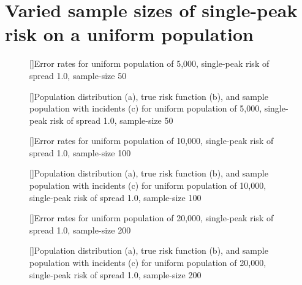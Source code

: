 {\section{Varied sample sizes of single-peak risk on a uniform population}
\label{sec:app:results_unifXk_X_1.0_1h}


\begin{figure}[!htb]
    
    []{Error rates for uniform population of 5,000, single-peak risk of \gls{spread} 1.0, sample-size 50}
    \label{tab:mean_error_rates:unif5k_50_1.0_1h}
    
    []{Population distribution (a), true risk function (b), and sample population with incidents (c) for uniform population of 5,000, single-peak risk of \gls{spread} 1.0, sample-size 50}
    \label{fig:distributions:unif5k_50_1.0_1h}    
\end{figure}


\begin{figure}[!htb]
    
    []{Error rates for uniform population of 10,000, single-peak risk of \gls{spread} 1.0, sample-size 100}
    \label{tab:mean_error_rates:unif10k_100_1.0_1h}
    
    []{Population distribution (a), true risk function (b), and sample population with incidents (c) for uniform population of 10,000, single-peak risk of \gls{spread} 1.0, sample-size 100}
    \label{fig:distributions:unif10k_100_1.0_1h}    
\end{figure}



\begin{figure}[!htb]
    
    []{Error rates for uniform population of 20,000, single-peak risk of \gls{spread} 1.0, sample-size 200}
    \label{tab:mean_error_rates:unif20k_200_1.0_1h}
    
    []{Population distribution (a), true risk function (b), and sample population with incidents (c) for uniform population of 20,000, single-peak risk of \gls{spread} 1.0, sample-size 200}
    \label{fig:distributions:unif20k_200_1.0_1h}    
\end{figure}


}
